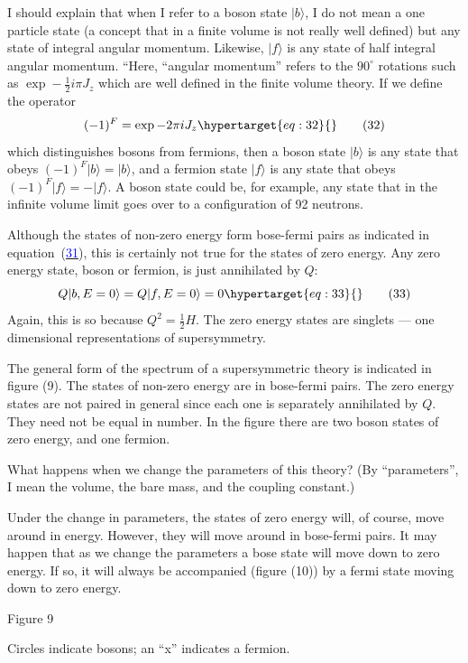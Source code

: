 \documentclass[11pt,a4paper]{article}
\newcommand{\eqtarget}[1]{\hypertarget{eq:#1}{\mathstrut}\tag{#1}}
\newcommand{\eqnref}[1]{(\hyperlink{eq:#1}{\textcolor{blue}{#1}})}
\begin{document}
I should explain that when I refer to a boson state $|b\rangle$, I do
not mean a one particle state (a concept that in a finite volume is
not really well defined) but any state of integral angular momentum.
Likewise, $|f\rangle$ is any state of half integral angular momentum. ``Here,
``angular momentum'' refers to the $90^\circ$ rotations such as $\exp - \frac{1}{2} i\pi J_z$
which are well defined in the finite volume theory. If we define
the operator
\begin{equation}
(-1)^F = \exp - 2\pi i J_z
\eqtarget{32}
\end{equation}
which distinguishes bosons from fermions, then a boson state $|b\rangle$ is
any state that obeys $(-1)^F |b\rangle = |b\rangle$, and a fermion state $|f\rangle$ is any
state that obeys $(-1)^F |f\rangle = -|f\rangle$. A boson state could be, for
example, any state that in the infinite volume limit goes over to a
configuration of 92 neutrons.

Although the states of non-zero energy form bose-fermi pairs
as indicated in equation~\eqnref{31}, this is certainly not true for the
states of zero energy. Any zero energy state, boson or fermion, is
just annihilated by $Q$:
\begin{equation}
Q|b, E = 0\rangle = Q|f, E = 0\rangle = 0
\eqtarget{33}
\end{equation}
Again, this is so because $Q^2 = \frac{1}{2} H$. The zero energy states are
singlets --- one dimensional representations of supersymmetry.

The general form of the spectrum of a supersymmetric theory is
indicated in figure (9). The states of non-zero energy are in bose-fermi
pairs. The zero energy states are not paired in general since
each one is separately annihilated by $Q$. They need not be equal in
number. In the figure there are two boson states of zero energy,
and one fermion.

What happens when we change the parameters of this theory?
(By ``parameters'', I mean the volume,
the bare mass, and the coupling
constant.)

Under the change in parameters,
the states of zero energy will, of
course, move around in energy.
However, they will move around in
bose-fermi pairs. It may happen
that as we change the parameters a
bose state will move down to zero
energy. If so, it will always be
accompanied (figure (10)) by a
fermi state moving down to zero
energy.

\begin{center}

\par\smallskip
Figure 9
\par\smallskip
Circles indicate bosons; an ``x'' indicates a fermion.
\end{center}
\end{document}
